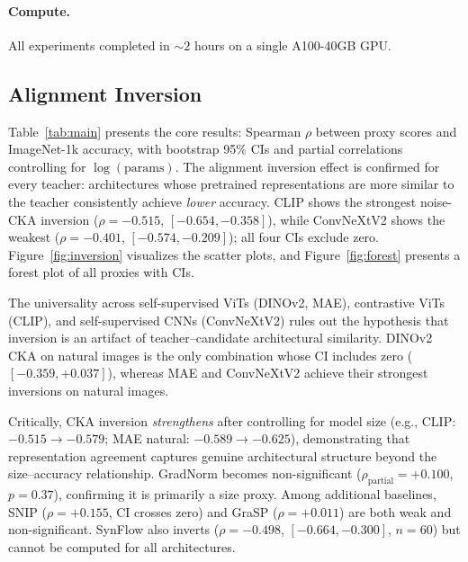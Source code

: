 \documentclass[10pt,twocolumn,letterpaper]{article}
\begin{document}
\paragraph{Compute.}
All experiments completed in ${\sim}2$ hours on a single A100-40GB GPU.


\subsection{Alignment Inversion}
\label{sec:main_results}

Table~\ref{tab:main} presents the core results: Spearman $\rho$ between proxy scores and ImageNet-1k accuracy, with bootstrap 95\% CIs and partial correlations controlling for $\log(\text{params})$.
The alignment inversion effect is confirmed for every teacher: architectures whose pretrained representations are more similar to the teacher consistently achieve \emph{lower} accuracy.
CLIP shows the strongest noise-CKA inversion ($\rho = -0.515$, $[-0.654, -0.358]$), while ConvNeXtV2 shows the weakest ($\rho = -0.401$, $[-0.574, -0.209]$); all four CIs exclude zero.
Figure~\ref{fig:inversion} visualizes the scatter plots, and Figure~\ref{fig:forest} presents a forest plot of all proxies with CIs.

The universality across self-supervised ViTs (DINOv2, MAE), contrastive ViTs (CLIP), and self-supervised CNNs (ConvNeXtV2) rules out the hypothesis that inversion is an artifact of teacher--candidate architectural similarity.
DINOv2 CKA on natural images is the only combination whose CI includes zero ($[-0.359, +0.037]$), whereas MAE and ConvNeXtV2 achieve their strongest inversions on natural images.

Critically, CKA inversion \emph{strengthens} after controlling for model size (e.g., CLIP: $-0.515 \to -0.579$; MAE natural: $-0.589 \to -0.625$), demonstrating that representation agreement captures genuine architectural structure beyond the size--accuracy relationship.
GradNorm becomes non-significant ($\rho_{\text{partial}} = +0.100$, $p = 0.37$), confirming it is primarily a size proxy.
Among additional baselines, SNIP ($\rho = +0.155$, CI crosses zero) and GraSP ($\rho = +0.011$) are both weak and non-significant.
SynFlow also inverts ($\rho = -0.498$, $[-0.664, -0.300]$, $n{=}60$) but cannot be computed for all architectures.
\end{document}
